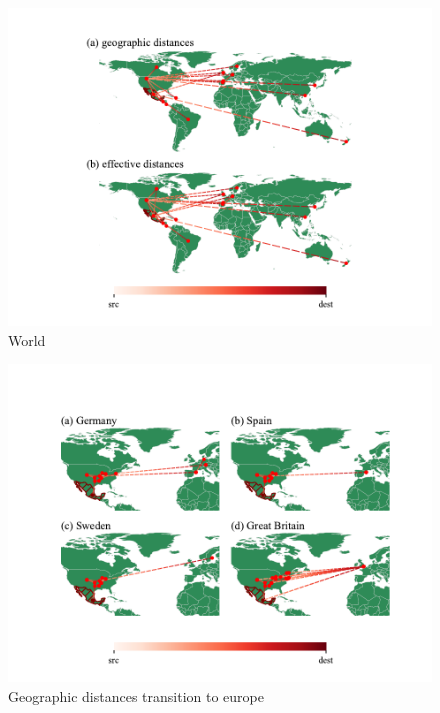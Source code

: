 \documentclass{article}
\begin{document}
\begin{figure}[!ht]
    \centering
    \includegraphics[width=\linewidth]{country_effective_country.pdf}
    \caption{World}%
    \label{fig:world effective}
\end{figure}

\begin{figure}[h!]
    \centering
    \includegraphics[width=\linewidth]{airport_geographic_europe.pdf}
    \caption{Geographic distances transition to europe}%
    \label{fig:Europe}
\end{figure}


  
  
\end{document}
